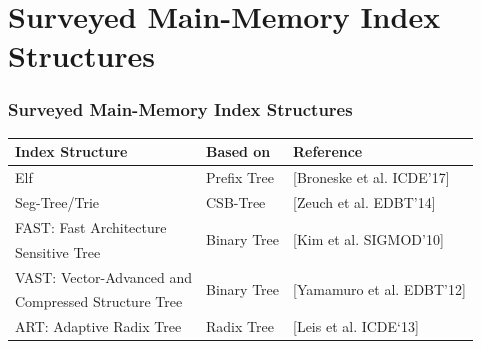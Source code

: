 \documentclass{beamer}
\begin{document}
\section{Surveyed Main-Memory Index Structures}

\begin{frame}
\frametitle{Surveyed Main-Memory Index Structures}
\footnotesize
	\begin{tabular}{l|l|l}%
		\hline
		\textbf{Index Structure} & \textbf{Based on} & \textbf{Reference} \\
		\hline
		Elf & Prefix Tree & [Broneske et al. ICDE’17] \nocite{BKS+17} \\[.2cm]
	    Seg-Tree/Trie & CSB-Tree & [Zeuch et al. EDBT’14] \nocite{zeuch2014adapting} \\[.2cm]
	    FAST: Fast Architecture & \multirow{2}{*}{Binary Tree} &  \multirow{2}{*}{[Kim et al. SIGMOD’10]} \nocite{kim2010fast} \\
	    Sensitive Tree  &&\\[.2cm] 
	    VAST: Vector-Advanced and  & \multirow{2}{*}{Binary Tree} &  \multirow{2}{*}{[Yamamuro et al. EDBT’12]} \nocite{yamamuro2012vast} \\
	    Compressed Structure Tree  &&\\[.2cm] 
	    ART: Adaptive Radix Tree  & Radix Tree & [Leis et al.  ICDE`13] \nocite{leis2013adaptive} \\[.1cm]
	\end{tabular}
	

\end{frame}
\end{document}
